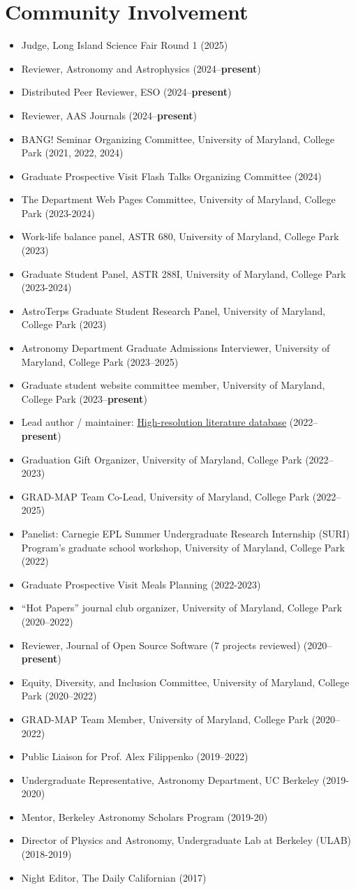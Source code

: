 \documentclass[letterpaper,10.5pt]{article}
\newcommand{\resumeItem}[2]{
  \item\small{
    \textbf{#1}{#2 \vspace{-2pt}}
  }
}
\newcommand{\resumeItemListStart}{\begin{itemize}}
\newcommand{\resumeItemListEnd}{\end{itemize}\vspace{-5pt}}
\newcommand{\shorterSection}[1]{\vspace{-10pt}\section{#1}}
\begin{document}
\shorterSection{Community Involvement}
\resumeItemListStart
\resumeItem{}{Judge, Long Island Science Fair Round 1 (2025)}
\resumeItem{}{Reviewer, Astronomy and Astrophysics (2024--\textbf{present})}
\resumeItem{}{Distributed Peer Reviewer, ESO (2024--\textbf{present})}
\resumeItem{}{Reviewer, AAS Journals (2024--\textbf{present})}
\resumeItem{}{BANG! Seminar Organizing Committee, University of Maryland, College Park (2021, 2022, 2024)}
\resumeItem{}{Graduate Prospective Visit Flash Talks Organizing Committee (2024)}
\resumeItem{}{The Department Web Pages Committee, University of Maryland, College Park (2023-2024)}
\resumeItem{}{Work-life balance panel, ASTR 680, University of Maryland, College Park (2023)}
\resumeItem{}{Graduate Student Panel, ASTR 288I, University of Maryland, College Park (2023-2024)}
\resumeItem{}{AstroTerps Graduate Student Research Panel, University of Maryland, College Park (2023)}
\resumeItem{}{Astronomy Department Graduate Admissions Interviewer, University of Maryland, College Park (2023--2025)}
\resumeItem{}{Graduate student website committee member, University of Maryland, College Park (2023--\textbf{present})}
\resumeItem{}{Lead author / maintainer: \href{https://www.arjunsavel.com/hires_papers.html}{High-resolution literature database} (2022--\textbf{present})}
\resumeItem{}{Graduation Gift Organizer, University of Maryland, College Park (2022--2023)}
\resumeItem{}{GRAD-MAP Team Co-Lead, University of Maryland, College Park (2022--2025)}
\resumeItem{}{Panelist: Carnegie EPL Summer Undergraduate Research Internship (SURI) Program’s graduate school workshop, University of Maryland, College Park (2022)}
\resumeItem{}{Graduate Prospective Visit Meals Planning (2022-2023)}
\resumeItem{}{``Hot Papers'' journal club organizer, University of Maryland, College Park (2020--2022)}
\resumeItem{}{Reviewer, Journal of Open Source Software (7 projects reviewed) (2020--\textbf{present})}
\resumeItem{}{Equity, Diversity, and Inclusion Committee, University of Maryland, College Park (2020--2022)}
\resumeItem{}{GRAD-MAP Team Member, University of Maryland, College Park (2020--2022)}
\resumeItem{}{Public Liaison for Prof. Alex Filippenko (2019--2022)}
\resumeItem{}{Undergraduate Representative, Astronomy Department, UC Berkeley (2019-2020)}
\resumeItem{}{Mentor, Berkeley Astronomy Scholars Program (2019-20)}
\resumeItem{}{Director of Physics and Astronomy, Undergraduate Lab at Berkeley (ULAB) (2018-2019)}
\resumeItem{}{Night Editor, The Daily Californian (2017)}
\resumeItemListEnd
\end{document}

